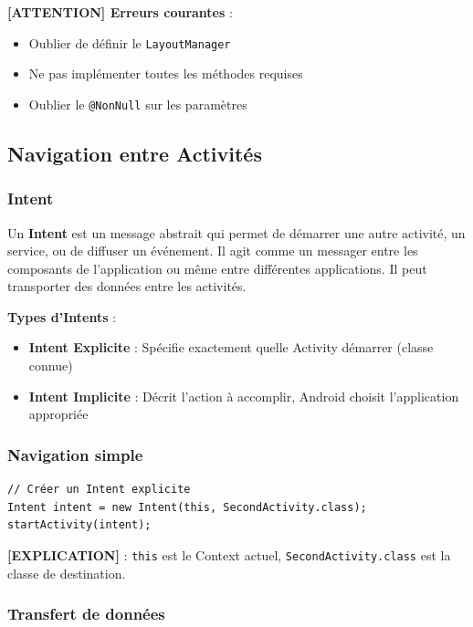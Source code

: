 \documentclass[11pt,a4paper]{article}
\begin{document}
\textbf{[ATTENTION] Erreurs courantes} :
\begin{itemize}
    \item Oublier de définir le \texttt{LayoutManager}
    \item Ne pas implémenter toutes les méthodes requises
    \item Oublier le \texttt{@NonNull} sur les paramètres
\end{itemize}

\subsection{Navigation entre Activités}

\subsubsection{Intent}

Un \textbf{Intent} est un message abstrait qui permet de démarrer une autre activité, un service, ou de diffuser un événement. Il agit comme un messager entre les composants de l'application ou même entre différentes applications. Il peut transporter des données entre les activités.

\textbf{Types d'Intents} :
\begin{itemize}
    \item \textbf{Intent Explicite} : Spécifie exactement quelle Activity démarrer (classe connue)
    \item \textbf{Intent Implicite} : Décrit l'action à accomplir, Android choisit l'application appropriée
\end{itemize}

\subsubsection{Navigation simple}

\begin{lstlisting}
// Créer un Intent explicite
Intent intent = new Intent(this, SecondActivity.class);
startActivity(intent);
\end{lstlisting}

\textbf{[EXPLICATION]} : \texttt{this} est le Context actuel, \texttt{SecondActivity.class} est la classe de destination.

\subsubsection{Transfert de données}
\end{document}
